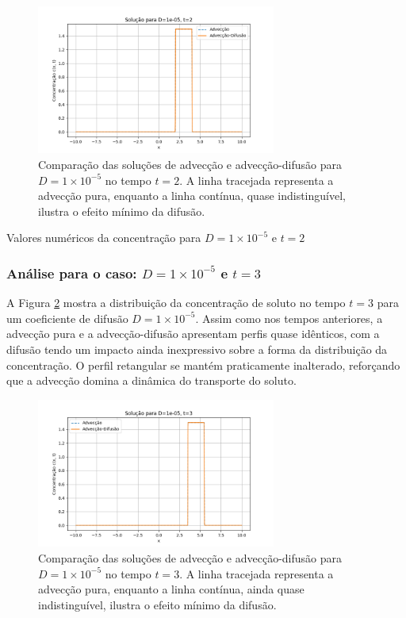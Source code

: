 \begin{figure}[H]
    \centering
    \includegraphics[width=0.7\textwidth]{code/plot/Advec_Difus_t2_D1e-05.png}
    \caption{Comparação das soluções de advecção e advecção-difusão para \( D = 1 \times 10^{-5} \) no tempo \( t = 2 \). A linha tracejada representa a advecção pura, enquanto a linha contínua, quase indistinguível, ilustra o efeito mínimo da difusão.}
    \label{fig:advec_diffus_1e-05_t2}
\end{figure}

\begin{table}[H]
    \centering
    \caption{Valores numéricos da concentração para \( D = 1 \times 10^{-5} \) e \( t = 2 \)}
    
\end{table}


\subsubsection{Análise para o caso: \( D = 1 \times 10^{-5} \) e \( t = 3 \)}

A Figura \ref{fig:advec_diffus_1e-05_t3} mostra a distribuição da concentração de soluto no tempo \( t = 3 \) para um coeficiente de difusão \( D = 1 \times 10^{-5} \). Assim como nos tempos anteriores, a advecção pura e a advecção-difusão apresentam perfis quase idênticos, com a difusão tendo um impacto ainda inexpressivo sobre a forma da distribuição da concentração. O perfil retangular se mantém praticamente inalterado, reforçando que a advecção domina a dinâmica do transporte do soluto.

\begin{figure}[H]
    \centering
    \includegraphics[width=0.7\textwidth]{code/plot/Advec_Difus_t3_D1e-05.png}
    \caption{Comparação das soluções de advecção e advecção-difusão para \( D = 1 \times 10^{-5} \) no tempo \( t = 3 \). A linha tracejada representa a advecção pura, enquanto a linha contínua, ainda quase indistinguível, ilustra o efeito mínimo da difusão.}
    \label{fig:advec_diffus_1e-05_t3}
\end{figure}

